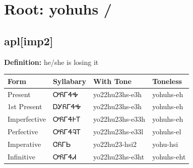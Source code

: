 \documentclass{article}%
\begin{document}
%
\normalsize%
\section*{Root: yohuhs / }%
\subsection*{apl[imp2]}%
\textbf{Definition: }%
he/she is losing it%
\\[0.5em]%
\begin{tabular}{|l|l|l|l|}%
\hline%
\textbf{Form}&\textbf{Syllabary}&\textbf{With Tone}&\textbf{Toneless}\\%
\hline%
Present&ᎤᏲᎱᏎᎭ&yo22hu23hs{-}e3h&yohuhs{-}eh\\%
1st Present&ᎠᎩᏲᎱᏎᎭ&yo22hu23hs{-}e3h&yohuhs{-}eh\\%
Imperfective&ᎤᏲᎱᏎᎰᎢ&yo22hu23hs{-}e33h&yohuhs{-}eh\\%
Perfective&ᎤᏲᎱᏎᎸᎢ&yo22hu23hs{-}e33l&yohuhs{-}el\\%
Imperative&ᏣᏲᎱᏏ&yo22hu23{-}hsi2&yohu{-}hsi\\%
Infinitive&ᎤᏲᎱᏎᏗ&yo22hu23hs{-}e3ht&yohuhs{-}eht\\%
\hline%
\end{tabular}%
\\[1em]%
\end{document}
